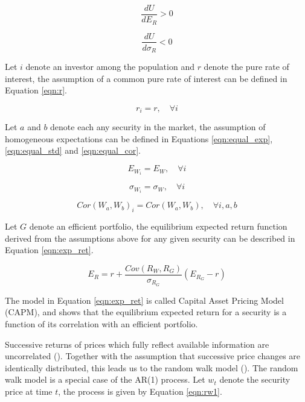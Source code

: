 \documentclass[cic,tc, english]{iiufrgs}
\begin{document}
    \begin{equation}
        \label{eqn:der1}
        \frac{dU}{dE_R} > 0
    \end{equation}

    \begin{equation}
        \label{eqn:der2}
        \frac{dU}{d\sigma_R} < 0
    \end{equation}

    Let $i$ denote an investor among the population and $r$ denote the pure rate of interest, the assumption of a common pure rate of interest can be defined in Equation \ref{eqn:r}.

    \begin{equation}
        \label{eqn:r}
        r_i = r, \quad \forall i
    \end{equation}

    Let $a$ and $b$ denote each any security in the market, the assumption of homogeneous expectations can be defined in Equations \ref{eqn:equal_exp}, \ref{eqn:equal_std} and \ref{eqn:equal_cor}.

    \begin{equation}
        \label{eqn:equal_exp}
        E_{W_i} = E_W, \quad \forall i
    \end{equation}

    \begin{equation}
        \label{eqn:equal_std}
        \sigma_{W_i} = \sigma_W, \quad \forall i
    \end{equation}

    \begin{equation}
        \label{eqn:equal_cor}
        Cor(W_a, W_b)_i = Cor(W_a, W_b), \quad \forall i, a, b
    \end{equation}

    Let $G$ denote an efficient portfolio, the equilibrium expected return function derived from the assumptions above for any given security can be described in Equation \ref{eqn:exp_ret}.

    \begin{equation}
        \label{eqn:exp_ret}
        E_R = r + \frac{Cov(R_W, R_G)}{\sigma_{R_G}} (E_{R_G} - r)
    \end{equation}

    The model in Equation \ref{eqn:exp_ret} is called Capital Asset Pricing Model (CAPM), and shows that the equilibrium expected return for a security is a function of its correlation with an efficient portfolio.
    
    Successive returns of prices which fully reflect available information are uncorrelated (\citet{samuelson1965}). Together with the assumption that successive price changes are identically distributed, this leads us to the random walk model (\citet{fama1970}). The random walk model is a special case of the AR(1) process. Let $w_t$ denote the security price at time $t$, the process is given by Equation \ref{eqn:rw1}.
    
\end{document}
